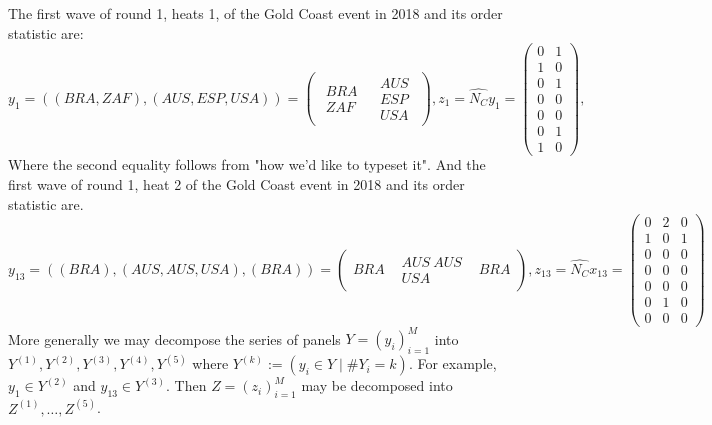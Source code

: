 \documentclass{article}
\begin{document}
The first wave of round 1, heats 1, of the Gold Coast event in 2018 and its order statistic are: 
\[
y_1 = (( BRA, ZAF) ,(AUS, ESP, USA)) = \begin{pmatrix} \begin{matrix} BRA \\ ZAF \end{matrix} & \begin{matrix} AUS \\ ESP \\ USA \end{matrix} \end{pmatrix}, z_1 =\hat{N_C}y_1 = \begin{pmatrix} 0 & 1 \\ 1 & 0 \\ 0 & 1 \\ 0 & 0 \\ 0 & 0 \\ 0 & 1 \\ 1 & 0 \end{pmatrix},
\]
Where the second equality follows from "how we'd like to typeset it". And the first wave of round 1, heat 2 of the Gold Coast event in 2018 and its order statistic are.
\[
y_{13} = ( (BRA), (AUS, AUS, USA), (BRA)) =\begin{pmatrix} BRA & \begin{matrix} AUS \: AUS \\ USA \end{matrix} & BRA \end{pmatrix}, 
z_{13} = \hat{N_C}x_{13} = \begin{pmatrix} 0 & 2 & 0 \\ 1 & 0 & 1 \\ 0 & 0 & 0 \\ 0 & 0 & 0 \\ 0 & 0 & 0 \\ 0 & 1 & 0 \\ 0 & 0 & 0 \end{pmatrix}
\]
More generally we may decompose the series of panels $Y = (y_i)_{i=1}^M$ into $Y^{(1)},Y^{(2)},Y^{(3)},Y^{(4)},Y^{(5)}$  where $Y^{(k)} := (y_i \in Y \mid \#Y_i = k )$. For example, $y_1 \in Y^{(2)}$ and $y_{13} \in Y^{(3)}$. Then $Z =(z_i)_{i=1}^M$ may be decomposed into $Z^{(1)}, \dots , Z^{(5)}$.
\end{document}

